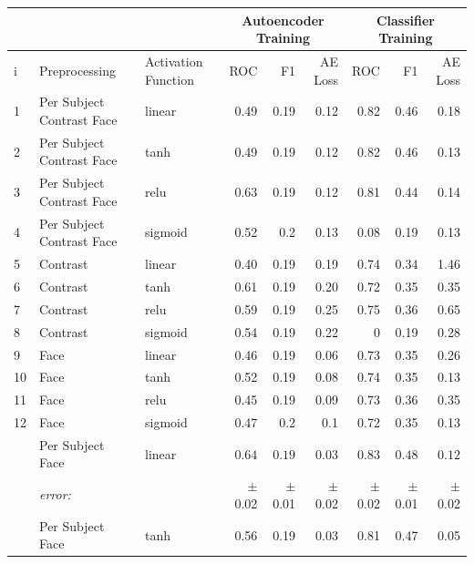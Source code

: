       \begin{table}[!h] {\footnotesize
        \centering
      \begin{tabular}{lllrrrrrr}
            && &   \multicolumn{3}{|c|}{Autoencoder Training} &  \multicolumn{3}{c|}{Classifier Training}    \\
        \hline
         i&Preprocessing    & Activation Function&  ROC&F1&AE Loss & ROC & F1 & AE Loss \\
         \hline
         1&Per Subject Contrast Face & linear &    0.49 &   0.19 &     0.12 &    0.82 &   0.46 &     0.18 \\
         2&Per Subject Contrast Face & tanh   &    0.49 &   0.19 &     0.12 &    0.82 &   0.46 &     0.13 \\
         3&Per Subject Contrast Face & relu   &    0.63 &   0.19 &     0.12 &    0.81 &   0.44 &     0.14 \\
         4& Per Subject Contrast Face & sigmoid &    0.52 &   0.2  &     0.13 &    0.08 &   0.19 &     0.13 \\
         \hline
         5&Contrast          & linear &    0.40 &   0.19 &     0.19 &    0.74 &   0.34 &     1.46 \\
         6&Contrast          & tanh   &    0.61 &   0.19 &     0.20 &    0.72 &   0.35 &     0.35 \\
         7&Contrast          & relu   &    0.59 &   0.19 &     0.25 &    0.75 &   0.36 &     0.65 \\
         8& Contrast         & sigmoid &    0.54 &   0.19 &     0.22 &    0    &   0.19 &     0.28 \\
         \hline
         9&Face              & linear &    0.46 &   0.19 &     0.06 &    0.73 &   0.35 &     0.26 \\
         10&Face              & tanh   &    0.52 &   0.19 &     0.08 &    0.74 &   0.35 &     0.13 \\
         11&Face              & relu   &    0.45 &   0.19 &     0.09 &    0.73 &   0.36 &     0.35 \\
         12& Face             & sigmoid &    0.47 &   0.2  &     0.1  &    0.72 &   0.35 &     0.13 \\
         \hline
         \hdashline
         13&Per Subject Face  & linear &    $0.64$ &   $0.19$ &     $0.03$ &    $0.83$ &   $0.48$ &     $0.12$ \\
         &{\it error:}  &&$\pm$0.02 &$\pm$0.01 &$\pm$0.02  &$\pm$0.02 &$\pm$0.01 &$\pm$0.02 \\
         \hdashline
         14&Per Subject Face  & tanh   &    0.56 &   0.19 &     0.03 &    0.81 &   0.47 &     0.05 \\

\end{tabular}}
\end{table}
